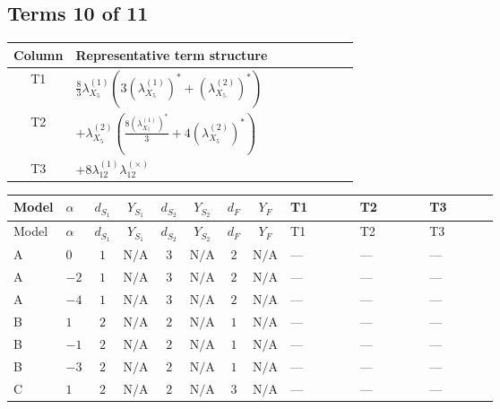 \documentclass[8pt]{article}
\begin{document}
\begin{landscape}
\subsection*{Terms 10 of 11}
\begin{center}
\begin{tabular}{@{}c >{\raggedright\arraybackslash}p{0.82\linewidth}@{}}
\toprule
Column & Representative term structure \\
\midrule
T1 & \(\displaystyle \frac{8}{3} {\lambda_{X_{5}}^{(1)}} (3 \left({\lambda_{X_{5}}^{(1)}}\right)^{*}+\left({\lambda_{X_{5}}^{(2)}}\right)^{*})\) \\
\midrule
T2 & \(\displaystyle +{\lambda_{X_{5}}^{(2)}} \left(\frac{8 \left({\lambda_{X_{5}}^{(1)}}\right)^{*}}{3}+4 \left({\lambda_{X_{5}}^{(2)}}\right)^{*}\right)\) \\
\midrule
T3 & \(\displaystyle +8 {\lambda_{12}^{(1)}} {\lambda_{12}^{(\times)}}\) \\
\midrule
\bottomrule
\end{tabular}
\end{center}
\smallskip
\tiny
\begin{longtable}{@{}llcccccc >{\raggedright\arraybackslash}p{0.21\linewidth} >{\raggedright\arraybackslash}p{0.21\linewidth} >{\raggedright\arraybackslash}p{0.21\linewidth}@{}}
\toprule
Model & $\alpha$ & $d_{S_1}$ & $Y_{S_1}$ & $d_{S_2}$ & $Y_{S_2}$ & $d_F$ & $Y_F$ & T1 & T2 & T3 \\
\midrule
\endfirsthead
\toprule
Model & $\alpha$ & $d_{S_1}$ & $Y_{S_1}$ & $d_{S_2}$ & $Y_{S_2}$ & $d_F$ & $Y_F$ & T1 & T2 & T3 \\
\midrule
\endhead
A & $0$ & $1$ & $\text{N/A}$ & $3$ & $\text{N/A}$ & $2$ & $\text{N/A}$ & --- & --- & --- \\
\midrule
A & $-2$ & $1$ & $\text{N/A}$ & $3$ & $\text{N/A}$ & $2$ & $\text{N/A}$ & --- & --- & --- \\
\midrule
A & $-4$ & $1$ & $\text{N/A}$ & $3$ & $\text{N/A}$ & $2$ & $\text{N/A}$ & --- & --- & --- \\
\midrule
B & $1$ & $2$ & $\text{N/A}$ & $2$ & $\text{N/A}$ & $1$ & $\text{N/A}$ & --- & --- & --- \\
\midrule
B & $-1$ & $2$ & $\text{N/A}$ & $2$ & $\text{N/A}$ & $1$ & $\text{N/A}$ & --- & --- & --- \\
\midrule
B & $-3$ & $2$ & $\text{N/A}$ & $2$ & $\text{N/A}$ & $1$ & $\text{N/A}$ & --- & --- & --- \\
\midrule
C & $1$ & $2$ & $\text{N/A}$ & $2$ & $\text{N/A}$ & $3$ & $\text{N/A}$ & --- & --- & --- \\

\end{longtable}
\end{landscape}
\end{document}
